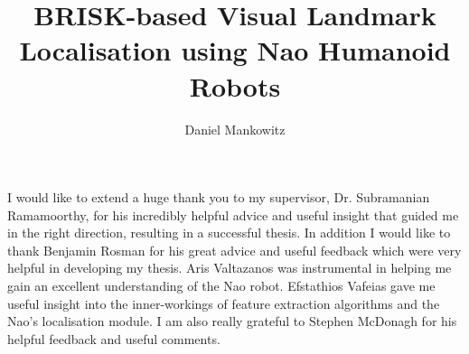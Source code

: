 \documentclass[msc, ai, logo, 11pt, twoside, sansheadings]{infthesis}  %
\title{BRISK-based Visual Landmark Localisation using Nao Humanoid Robots}
\author{Daniel Mankowitz}
\begin{document}
\begin{preliminary}

\maketitle

\begin{acknowledgements}
I would like to extend a huge thank you to my supervisor, Dr. Subramanian Ramamoorthy, for his incredibly helpful advice and useful insight that guided me in the right direction, resulting in a successful thesis. In addition I would like to thank Benjamin Rosman for his great advice and useful feedback which were very helpful in developing my thesis. Aris Valtazanos was instrumental in helping me gain an excellent understanding of the Nao robot. Efstathios Vafeias gave me useful insight into the inner-workings of feature extraction algorithms and the Nao's localisation module. I am also really grateful to Stephen McDonagh for his helpful feedback and useful comments.\\
\end{acknowledgements}

\standarddeclaration


\tableofcontents

 \listoffigures
 \listoftables

\end{preliminary}









% 

\appendix







\end{document}

